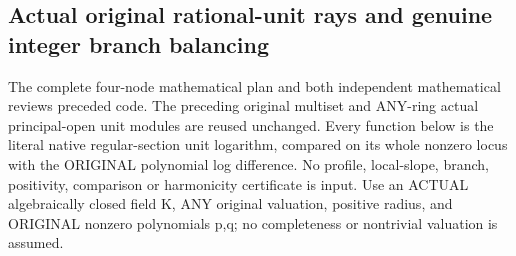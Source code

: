 \subsection{Actual original rational-unit rays and genuine integer branch balancing}

The complete four-node mathematical plan and both independent mathematical
reviews preceded code. The preceding original multiset and ANY-ring actual
principal-open unit modules are reused unchanged. Every function below is
the literal native regular-section unit logarithm, compared on its whole
nonzero locus with the ORIGINAL polynomial log difference. No profile,
local-slope, branch, positivity, comparison or harmonicity certificate is input.
Use an ACTUAL algebraically closed field K, ANY original valuation, positive
radius, and ORIGINAL nonzero polynomials p,q; no completeness or nontrivial
valuation is assumed.

